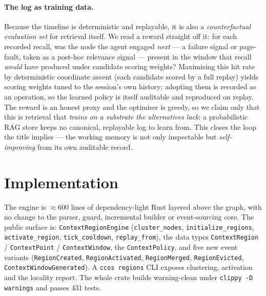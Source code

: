 \documentclass[11pt]{article}
\newcommand{\code}[1]{\texttt{#1}}
\begin{document}
\paragraph{The log as training data.} Because the timeline is deterministic and
replayable, it is also a \emph{counterfactual evaluation set} for retrieval
itself. We read a reward straight off it: for each recorded recall, was the node
the agent engaged \emph{next} --- a failure signal or page-fault, taken as a
post-hoc relevance signal --- present in the window that recall \emph{would} have
produced under candidate scoring weights? Maximising this hit rate by deterministic
coordinate ascent (each candidate scored by a full replay) yields scoring weights
tuned to the session's own history; adopting them is recorded as an operation, so
the learned policy is itself auditable and reproduced on replay. The reward is an
honest proxy and the optimiser is greedy, so we claim only that this is retrieval
that \emph{trains on a substrate the alternatives lack}: a probabilistic RAG store
keeps no canonical, replayable log to learn from. This closes the loop the title
implies --- the working memory is not only inspectable but \emph{self-improving}
from its own auditable record.

\section{Implementation}\label{sec:impl}

The engine is $\approx\!600$ lines of dependency-light Rust layered above the
graph, with no change to the parser, guard, incremental builder or event-sourcing
core. The public surface is: \code{ContextRegionEngine} (\code{cluster\_nodes},
\code{initialize\_regions}, \code{activate\_region}, \code{tick\_cooldown},
\code{replay\_from}), the data types \code{ContextRegion} / \code{ContextPoint} /
\code{ContextWindow}, the \code{ContextPolicy}, and five new event variants
(\code{RegionCreated}, \code{RegionActivated}, \code{RegionMerged},
\code{RegionEvicted}, \code{ContextWindowGenerated}). A \code{ccos regions} CLI
exposes clustering, activation and the locality report. The whole crate builds
warning-clean under \code{clippy -D warnings} and passes 431 tests.
\end{document}
